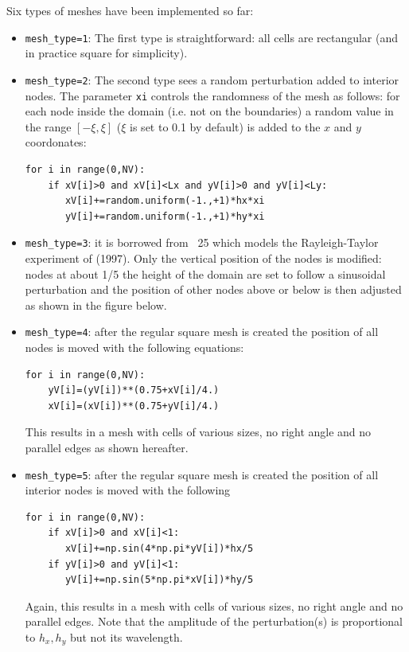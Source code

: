 Six types of meshes have been implemented so far: 
\begin{itemize}
\item \lstinline{mesh_type=1}:
The first type is straightforward: all cells are rectangular (and in 
practice square for simplicity).
\item \lstinline{mesh_type=2}:
The second type sees a random perturbation added to interior nodes.
The parameter \lstinline{xi} controls the randomness of the mesh as follows:
for each node inside the domain (i.e. not on the boundaries) a random value 
in the range $[-\xi,\xi]$ ($\xi$ is set to 0.1 by default) 
is added to the $x$ and $y$ coordonates:
\begin{lstlisting}
for i in range(0,NV):
    if xV[i]>0 and xV[i]<Lx and yV[i]>0 and yV[i]<Ly:
       xV[i]+=random.uniform(-1.,+1)*hx*xi
       yV[i]+=random.uniform(-1.,+1)*hy*xi
\end{lstlisting}
\item \lstinline{mesh_type=3}:
it is borrowed from \stone~25 which models the 
Rayleigh-Taylor experiment of \textcite{vaks97} (1997). Only the vertical position 
of the nodes is modified: nodes at about 1/5 the height of the domain are set to 
follow a sinusoidal perturbation and the position of other nodes above or below
is then adjusted as shown in the figure below. 

\item \lstinline{mesh_type=4}: after the regular square mesh 
is created the position of all nodes is moved with the following 
equations:
\begin{lstlisting}
for i in range(0,NV):
    yV[i]=(yV[i])**(0.75+xV[i]/4.)
    xV[i]=(xV[i])**(0.75+yV[i]/4.)
\end{lstlisting}
This results in a mesh with cells of various sizes, no right angle and no parallel edges
as shown hereafter.

\item \lstinline{mesh_type=5}: after the regular square mesh 
is created the position of all interior nodes is moved with the following
\begin{lstlisting}
for i in range(0,NV):
    if xV[i]>0 and xV[i]<1: 
       xV[i]+=np.sin(4*np.pi*yV[i])*hx/5
    if yV[i]>0 and yV[i]<1: 
       yV[i]+=np.sin(5*np.pi*xV[i])*hy/5
\end{lstlisting}
Again, this results in a mesh with cells of various sizes, no right angle and no parallel edges.
Note that the amplitude of the perturbation(s) is proportional to $h_x,h_y$ but not its wavelength.


\end{itemize}
